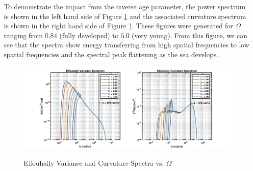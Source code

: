 To demonstrate the impact from the inverse age parameter, the power spectrum is shown in the left hand side of Figure \ref{os_fig:3a} and the associated curvature spectrum is shown in the right hand side of Figure \ref{os_fig:3a}. These figures were generated for $\Omega$ ranging from $0.84$ (fully developed) to $5.0$ (very young). From this figure, we can see that the spectra show energy transferring from high spatial frequencies to low spatial frequencies and the spectral peak flattening as the sea develops.
\begin{figure}[H]
  \begin{center}
\includegraphics[width=6in]{../media/Ocean_Surface/elf_variance_curvature_spectrum_age.png}
  \end{center}
  \renewcommand{\baselinestretch}{1} \small\normalsize
  \begin{quote}
    \caption[Elfouhaily Variance and Curvature Spectra vs. $\Omega$]{Elfouhaily Variance and Curvature Spectra vs. $\Omega$ \label{os_fig:3a}}
  \end{quote}
\end{figure}
\renewcommand{\baselinestretch}{2} \small\normalsize

